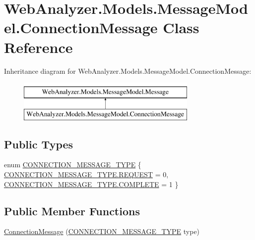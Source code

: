 \hypertarget{class_web_analyzer_1_1_models_1_1_message_model_1_1_connection_message}{}\section{Web\+Analyzer.\+Models.\+Message\+Model.\+Connection\+Message Class Reference}
\label{class_web_analyzer_1_1_models_1_1_message_model_1_1_connection_message}
Inheritance diagram for Web\+Analyzer.\+Models.\+Message\+Model.\+Connection\+Message\+:\begin{figure}[H]
\begin{center}
\leavevmode
\includegraphics[height=2.000000cm]{class_web_analyzer_1_1_models_1_1_message_model_1_1_connection_message}
\end{center}
\end{figure}
\subsection*{Public Types}
\begin{DoxyCompactItemize}
\item 
enum \hyperlink{class_web_analyzer_1_1_models_1_1_message_model_1_1_connection_message_a0b8ebc456d3aed9c51235f2a1a1a1cdb}{C\+O\+N\+N\+E\+C\+T\+I\+O\+N\+\_\+\+M\+E\+S\+S\+A\+G\+E\+\_\+\+T\+Y\+P\+E} \{ \hyperlink{class_web_analyzer_1_1_models_1_1_message_model_1_1_connection_message_a0b8ebc456d3aed9c51235f2a1a1a1cdbaad6c35880c58d97c03d60a6ad0f23737}{C\+O\+N\+N\+E\+C\+T\+I\+O\+N\+\_\+\+M\+E\+S\+S\+A\+G\+E\+\_\+\+T\+Y\+P\+E.\+R\+E\+Q\+U\+E\+S\+T} = 0, 
\hyperlink{class_web_analyzer_1_1_models_1_1_message_model_1_1_connection_message_a0b8ebc456d3aed9c51235f2a1a1a1cdba3de44296982e58199afc513a715b12ba}{C\+O\+N\+N\+E\+C\+T\+I\+O\+N\+\_\+\+M\+E\+S\+S\+A\+G\+E\+\_\+\+T\+Y\+P\+E.\+C\+O\+M\+P\+L\+E\+T\+E} = 1
 \}
\end{DoxyCompactItemize}
\subsection*{Public Member Functions}
\begin{DoxyCompactItemize}
\item 
\hyperlink{class_web_analyzer_1_1_models_1_1_message_model_1_1_connection_message_a28b97882765f7759b31981ef271deaf3}{Connection\+Message} (\hyperlink{class_web_analyzer_1_1_models_1_1_message_model_1_1_connection_message_a0b8ebc456d3aed9c51235f2a1a1a1cdb}{C\+O\+N\+N\+E\+C\+T\+I\+O\+N\+\_\+\+M\+E\+S\+S\+A\+G\+E\+\_\+\+T\+Y\+P\+E} type)
\end{DoxyCompactItemize}
